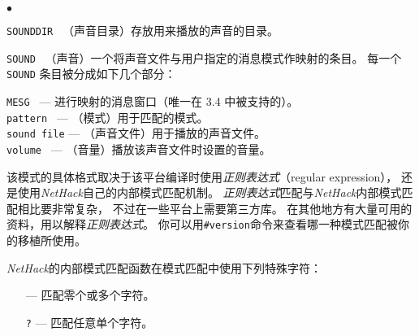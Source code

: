 \documentclass[a4paper, 10pt]{article}
\newcommand{\tb}[1]{\tt #1 \hfill}
\newcommand{\ib}[1]{\it #1 \hfill}
\newcommand{\blist}[1]
{\begin{list}{$\bullet$}
    {\leftmargin 30mm \topsep 2mm \partopsep 0mm \parsep 0mm \itemsep 1mm
     \labelwidth 28mm \labelsep 2mm
     #1}}
\newcommand{\elist}{\end{list}}
\begin{document}
\blist{}
\item[\tb{SOUNDDIR}]
（声音目录）存放用来播放的声音的目录。
\item[\tb{SOUND}]
（声音）一个将声音文件与用户指定的消息模式作映射的条目。
每一个 {\tt SOUND} 条目被分成如下几个部分：

{\tt MESG      } --- 进行映射的消息窗口（唯一在 3.4 中被支持的）。\\
{\tt pattern   } --- （模式）用于匹配的模式。\\
{\tt sound file} --- （声音文件）用于播放的声音文件。\\
{\tt volume    } --- （音量）播放该声音文件时设置的音量。
\elist

该模式的具体格式取决于该平台编译时使用{\it 正则表达式}（regular expression），
还是使用{\it NetHack}自己的内部模式匹配机制。
{\it 正则表达式}匹配与{\it NetHack}内部模式匹配相比要非常复杂，
不过在一些平台上需要第三方库。
在其他地方有大量可用的资料，用以解释{\it 正则表达式}。
你可以用{\tt \#version}命令来查看哪一种模式匹配被你的移植所使用。

{\it NetHack}的内部模式匹配函数在模式匹配中使用下列特殊字符：

\begin{itemize}[leftmargin=5em, noitemsep, nolistsep]
  \item[] {\tt *} --- 匹配零个或多个字符。
  \item[] {\tt ?} --- 匹配任意单个字符。
\end{itemize}
\end{document}
